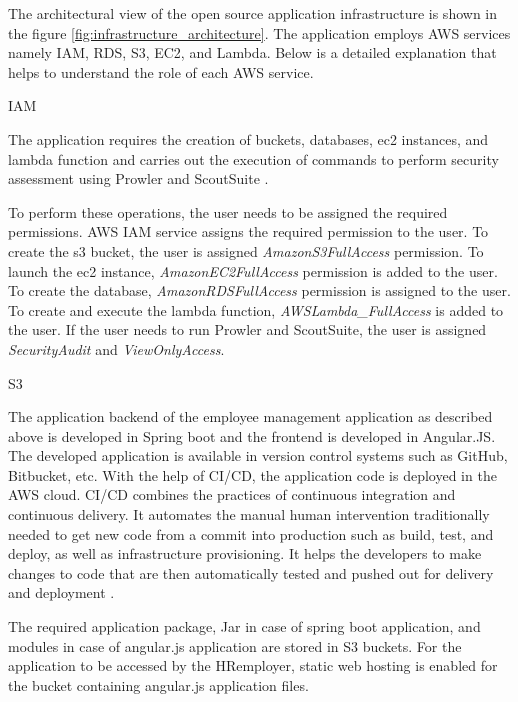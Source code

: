 \par The architectural view of the open source application infrastructure is shown in the figure
\ref{fig:infrastructure_architecture}.
The application employs AWS services namely IAM, RDS, S3, EC2, and Lambda.
Below is a detailed explanation that helps to understand the role of each AWS service.

\par IAM

\par The application requires the creation of buckets, databases, ec2 instances, and lambda function and carries out the
execution of commands to perform security assessment using Prowler and ScoutSuite \cite{70}.

\par To perform these operations, the user needs to be assigned the required permissions.
AWS IAM service assigns the
required permission to the user.
To create the s3 bucket, the user is assigned \textit{AmazonS3FullAccess} permission.
To launch the ec2 instance, \textit{AmazonEC2FullAccess} permission is added to the user.
To create the database,
\textit{AmazonRDSFullAccess} permission is assigned to the user.
To create and execute the lambda function,
\textit{AWSLambda\_FullAccess} is added to the user.
If the user needs to run Prowler and ScoutSuite, the user is
assigned \textit{SecurityAudit} and \textit{ViewOnlyAccess}.

\par S3

\par The application backend of the employee management application as described above is developed in Spring boot and the frontend is developed in Angular.JS. The developed application is available in version control systems such as GitHub, Bitbucket, etc.
With the help of CI/CD, the application code is deployed in the AWS cloud.
CI/CD combines the practices of continuous integration and continuous delivery.
It automates the manual human intervention traditionally needed to get new code from a commit into production such as build, test, and deploy, as well as infrastructure provisioning.
It helps the developers to make changes to code that are then automatically tested and pushed out for delivery and deployment \cite{71}.

\par The required application package, Jar in case of spring boot application, and modules in case of angular.js application are stored in S3 buckets.
For the application to be accessed by the HR\/employer, static web hosting is enabled for the bucket containing angular.js application files.




